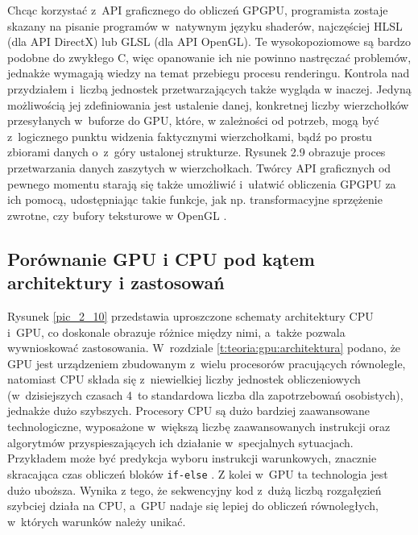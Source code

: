		
		Chcąc korzystać z~API graficznego do obliczeń GPGPU, programista zostaje skazany na pisanie programów w~natywnym języku shaderów, najczęściej HLSL (dla API DirectX) lub GLSL (dla API OpenGL). Te wysokopoziomowe są bardzo podobne do zwykłego C, więc opanowanie ich nie powinno nastręczać problemów, jednakże wymagają wiedzy na temat przebiegu procesu renderingu. Kontrola nad przydziałem i~liczbą jednostek przetwarzających także wygląda w inaczej. Jedyną możliwością jej zdefiniowania jest ustalenie danej, konkretnej liczby wierzchołków przesyłanych w~buforze do GPU, które, w zależności od potrzeb, mogą być z~logicznego punktu widzenia faktycznymi wierzchołkami, bądź po prostu zbiorami danych o~z~góry ustalonej strukturze. Rysunek 2.9 obrazuje proces przetwarzania danych zaszytych w wierzchołkach. Twórcy API graficznych od pewnego momentu starają się także umożliwić i~ułatwić obliczenia GPGPU za ich pomocą, udostępniając takie funkcje, jak np. transformacyjne sprzężenie zwrotne, czy bufory teksturowe w OpenGL \cite{receptury}. \newpage
		
		\subsection{Porównanie GPU i CPU pod kątem architektury i zastosowań}
		\label{t:teoria:gpu:porownanie}
		
		
		Rysunek \ref{pic_2_10} przedstawia uproszczone schematy architektury CPU i~GPU, co doskonale obrazuje różnice między nimi, a~także pozwala wywnioskować zastosowania. W~rozdziale \ref{t:teoria:gpu:architektura} podano, że GPU jest urządzeniem zbudowanym z~wielu procesorów pracujących równolegle, natomiast CPU składa się z~niewielkiej liczby jednostek obliczeniowych (w~dzisiejszych czasach 4~to standardowa liczba dla zapotrzebowań osobistych), jednakże dużo szybszych. Procesory CPU są dużo bardziej zaawansowane technologiczne, wyposażone w~większą liczbę zaawansowanych instrukcji oraz algorytmów przyspieszających ich działanie w~specjalnych sytuacjach. Przykładem może być predykcja wyboru instrukcji warunkowych, znacznie skracająca czas obliczeń bloków \texttt{if-else} \cite{branch_prediction_wiki}. Z kolei w~GPU ta technologia jest dużo uboższa. Wynika z tego, że sekwencyjny kod z~dużą liczbą rozgałęzień szybciej działa na CPU, a~GPU nadaje się lepiej do obliczeń równoległych, w~których warunków należy unikać. 
		
